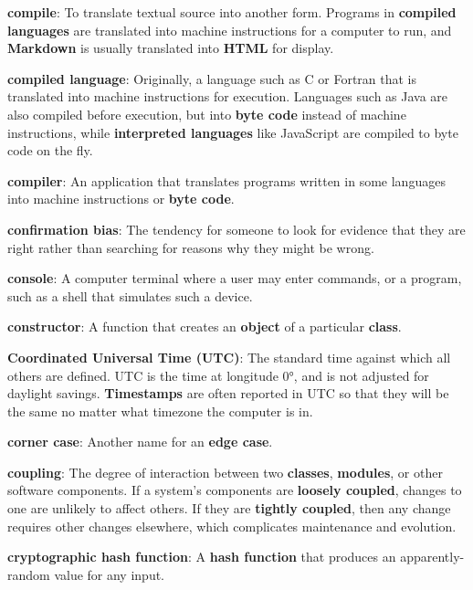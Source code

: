 \documentclass[krantzl]{krantz}
\newcommand{\glosskey}[1]{\textbf{#1}}
\begin{document}
\noindent \textbf{\glosskey{compile}}: 
To translate textual source into another form. Programs in \glosskey{compiled languages} are translated into machine instructions for a computer to run, and \glosskey{Markdown} is usually translated into \glosskey{HTML} for display.


\noindent \textbf{\glosskey{compiled language}}: 
Originally, a language such as C or Fortran that is translated into machine instructions for execution. Languages such as Java are also compiled before execution, but into \glosskey{byte code} instead of machine instructions, while \glosskey{interpreted languages} like JavaScript are compiled to byte code on the fly.


\noindent \textbf{\glosskey{compiler}}: 
An application that translates programs written in some languages into machine instructions or \glosskey{byte code}.


\noindent \textbf{\glosskey{confirmation bias}}: 
The tendency for someone to look for evidence that they are right rather than searching for reasons why they might be wrong.


\noindent \textbf{\glosskey{console}}: 
A computer terminal where a user may enter commands, or a program, such as a shell that simulates such a device.


\noindent \textbf{\glosskey{constructor}}: 
A function that creates an \glosskey{object} of a particular \glosskey{class}.


\noindent \textbf{\glosskey{Coordinated Universal Time} (UTC)}: 
The standard time against which all others are defined. UTC is the time at longitude 0°, and is not adjusted for daylight savings. \glosskey{Timestamps} are often reported in UTC so that they will be the same no matter what timezone the computer is in.


\noindent \textbf{\glosskey{corner case}}: 
Another name for an \glosskey{edge case}.


\noindent \textbf{\glosskey{coupling}}: 
The degree of interaction between two \glosskey{classes}, \glosskey{modules}, or other software components. If a system's components are \glosskey{loosely coupled}, changes to one are unlikely to affect others.  If they are \glosskey{tightly coupled}, then any change requires other changes elsewhere, which complicates maintenance and evolution.


\noindent \textbf{\glosskey{cryptographic hash function}}: 
A \glosskey{hash function} that produces an apparently-random value for any input.
\end{document}
